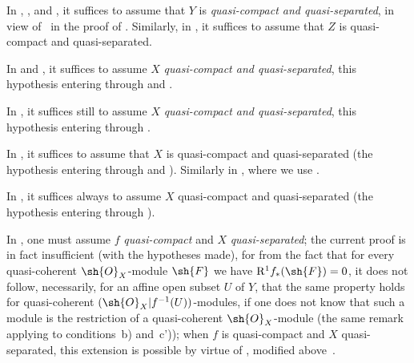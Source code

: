 \begin{env}[1.7.13]
\label{IV.1.7.13}
In , , and , it suffices to assume that $Y$ is \emph{quasi-compact and quasi-separated}, in view of~ in the proof of .
Similarly, in , it suffices to assume that $Z$ is quasi-compact and quasi-separated.
\end{env}

\begin{env}[1.7.14]
\label{IV.1.7.14}
In  and , it suffices to assume $X$ \emph{quasi-compact and quasi-separated}, this hypothesis entering through  and .
\end{env}

\begin{env}[1.7.15]
\label{IV.1.7.15}
In , it suffices still to assume $X$ \emph{quasi-compact and quasi-separated}, this hypothesis entering through .
\end{env}

\begin{env}[1.7.16]
\label{IV.1.7.16}
In , it suffices to assume that $X$ is quasi-compact and quasi-separated (the hypothesis entering through  and ).
Similarly in , where we use .
\end{env}

\begin{env}[1.7.17]
\label{IV.1.7.17}
In , it suffices always to assume $X$ quasi-compact and quasi-separated (the hypothesis entering through ).
\end{env}

\begin{env}[1.7.18]
\label{IV.1.7.18}
In , one must assume $f$ \emph{quasi-compact} and $X$ \emph{quasi-separated}; the current proof is in fact insufficient (with the hypotheses made), for from the fact that for every quasi-coherent $\sh{O}_X$-module $\sh{F}$ we have $\mathrm{R}^1 f_*(\sh{F})=0$, it does not follow, necessarily, for an affine open subset $U$ of $Y$, that the same property holds for quasi-coherent $(\sh{O}_X|f^{-1}(U))$-modules, if one does not know that such a module is the restriction of a quasi-coherent $\sh{O}_X$-module (the same remark applying to conditions~b) and~c')); when $f$ is quasi-compact and $X$ quasi-separated, this extension is possible by virtue of , modified above~.
\end{env}

